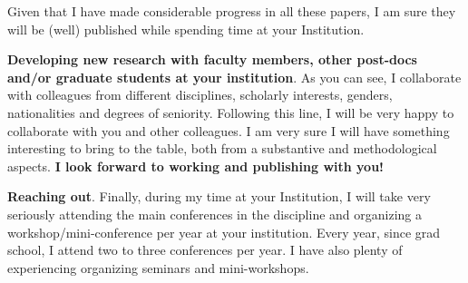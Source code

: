 \documentclass[10pt,stdletter,dateno,sigleft]{newlfm} %
\begin{document}
\begin{newlfm}
Given that I have made considerable progress in all these papers, I am sure they will be (well) published while spending time at your Institution.

{\bf Developing new research with faculty members, other post-docs and/or graduate students at your institution}. As you can see, I collaborate with colleagues from different disciplines, scholarly interests, genders, nationalities and degrees of seniority. Following this line, I will be very happy to collaborate with you and other colleagues. I am very sure I will have something interesting to bring to the table, both from a substantive and methodological aspects. {\bf I look forward to working and publishing with you!}

{\bf Reaching out}. Finally, during my time at your Institution, I will take very seriously attending the main conferences in the discipline and organizing a workshop/mini-conference per year at your institution. Every year, since grad school, I attend two to three conferences per year. I have also plenty of experiencing organizing seminars and mini-workshops. 

{\unskip}


\vspace{-10cm}



\end{newlfm}
\end{document}
